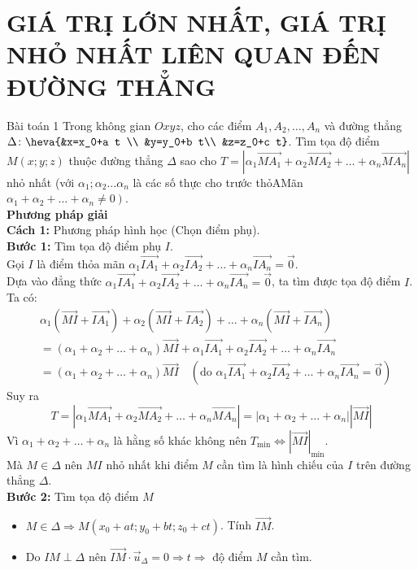 \section{GIÁ TRỊ LỚN NHẤT, GIÁ TRỊ NHỎ NHẤT LIÊN QUAN ĐẾN ĐƯỜNG THẲNG}
\begin{dang}{Bài toán 1}
Trong không gian $Oxyz$, cho các điểm $A_1, A_2, \ldots, A_n$ và đường thẳng
$\Delta\colon\heva{&x=x_0+a t \\ &y=y_0+b t\\ &z=z_0+c t}$.
Tìm tọa độ điểm $M(x ; y ; z)$ thuộc đường thẳng $\Delta$ sao cho
$T=\left|\alpha_1 \vec{MA_1}+\alpha_2 \vec{MA_2}+\ldots+\alpha_n \vec{MA_n}\right|$ nhỏ nhất (với $\alpha_1 ; \alpha_2 \ldots \alpha_n$ là các số thực cho trước thỏAMãn $\left.\alpha_1+\alpha_2+\ldots+\alpha_n \neq 0\right)$.
\\
\textbf{Phương pháp giải}
\\
\textbf{Cách 1:} Phương pháp hình học (Chọn điểm phụ).
\\
\textbf{Bước 1:} Tìm tọa độ điểm phụ $I$.
\\
Gọi $I$ là điểm thỏa mãn $\alpha_1 \vec{IA_1}+\alpha_2 \vec{IA_2}+\ldots+\alpha_n \vec{IA_n}=\vec{0}$.
\\
Dựa vào đẳng thức
$\alpha_1 \vec{IA_1}+\alpha_2 \vec{IA_2}+\ldots+\alpha_n \vec{IA_n}=\vec{0}$,
ta tìm được tọa độ điểm $I$.
Ta có:
\begin{align*}
	&\alpha_1\left(\vec{MI}+\vec{IA_1}\right)+\alpha_2\left(\vec{MI}+\vec{IA_2}\right)+\ldots+\alpha_n\left(\vec{MI}+\vec{IA_n}\right)\\
	&= \left(\alpha_1+\alpha_2+\ldots+\alpha_n\right) \vec{MI}+\alpha_1 \vec{IA_1}+\alpha_2 \vec{IA_2}+\ldots+\alpha_n \vec{IA_n} \\
	&= \left(\alpha_1+\alpha_2+\ldots+\alpha_n\right) \vec{MI} \quad \left(\text {do } \alpha_1 \vec{IA_1}+\alpha_2 \vec{IA_2}+\ldots+\alpha_n \vec{IA_n}=\vec{0}\right) 
\end{align*}
Suy ra
$$
	T=\left|\alpha_1 \vec{MA_1}+\alpha_2 \vec{MA_2}+\ldots+\alpha_n \vec{MA_n}\right|=\left|\alpha_1+\alpha_2+\ldots+\alpha_n\right||\vec{MI}|
$$
Vì $\alpha_1+\alpha_2+\ldots+\alpha_n$ là hằng số khác không nên $T_{\min } \Leftrightarrow|\vec{MI}|_{\min }$.
\\
Mà $M \in \Delta$ nên $MI$ nhỏ nhất khi điểm $M$ cần tìm là hình chiếu của $I$ trên đường thẳng $\Delta$.
\\
\textbf{Bước 2:} Tìm tọa độ điểm $M$
\begin{itemize}
	\item $M \in \Delta \Rightarrow M\left(x_0+a t ; y_0+b t ; z_0+c t\right)$. Tính $\vec{I M}$.
	\item Do $I M \perp \Delta$ nên $\vec{I M} \cdot \vec{u}_{\Delta}=0 \Rightarrow t \Rightarrow$ độ điểm $M$ cần tìm.
\end{itemize}


\end{dang}
